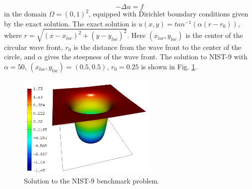\documentclass[12pt]{elsarticle}
\begin{document}
\begin{equation} \label{wave-front}
-\Delta u = f
\end{equation}
in the domain $\Omega = (0, 1)^2$, equipped with Dirichlet boundary conditions
given by the exact solution. The exact solution is
$u(x, y) = tan^{-1}(\alpha (r - r_{0}))$,
where $r = \sqrt{(x - x_{loc})^{2} + (y - y_{loc})^{2}}$.
Here $(x_{loc}, y_{loc})$ is the center of the circular wave front,
$r_{0}$ is the distance from the wave front to the center of the circle,
and $\alpha$ gives the steepness of the wave front.
The solution to NIST-9 with $\alpha = 50$, $(x_{loc}, y_{loc}) = (0.5, 0.5)$,
$r_{0} = 0.25$ is shown in Fig. \ref{fig:sln-nist09}.

\begin{figure}[H]
\centering
\vspace{-3mm}
\includegraphics[height=5cm]{nist/nist-9/solution.png}
\vspace{-3mm}
\caption{Solution to the NIST-9 benchmark problem.}
\vspace{-3mm}
\label{fig:sln-nist09}
\end{figure}
\end{document}
